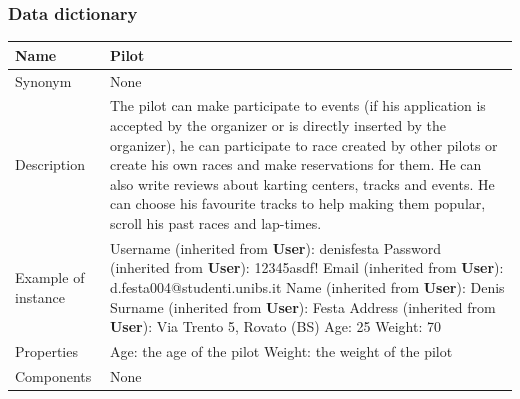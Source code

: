 \documentclass{beamer}
\begin{document}
\begin{frame}
    \frametitle{Data dictionary}
    \begin{table}
    \tiny
    \begin{tabular}{|p{2cm}|p{6cm}|}
    \hline
    Name & \textbf{Pilot} \\
    \hline
    Synonym & None \\
    \hline
    Description & The pilot can make participate to events (if his application
    is accepted by the organizer or is directly inserted by the organizer),
    he can participate to race created by other pilots or create his own
    races and make reservations for them. 
    He can also write reviews about karting centers, tracks and events.
    He can choose his favourite tracks to help making them popular,
    scroll his past races and lap-times. \\
    \hline
    Example of instance &
    Username (inherited from \textbf{User}): denisfesta \newline
    Password (inherited from \textbf{User}): 12345asdf!  \newline
    Email (inherited from \textbf{User}): d.festa004@studenti.unibs.it \newline
    Name (inherited from \textbf{User}): Denis \newline
    Surname (inherited from \textbf{User}): Festa \newline
    Address (inherited from \textbf{User}): Via Trento 5, Rovato (BS) \newline
    Age: 25 \newline
    Weight: 70 \\
    \hline
    Properties &
    Age: the age of the pilot \newline
    Weight: the weight of the pilot \\
    \hline
    Components & None \\
    \hline
\end{tabular}
\end{table}
\end{frame}
\end{document}
